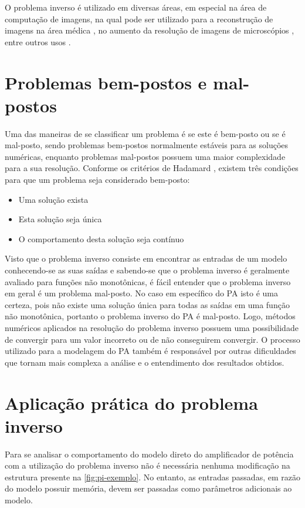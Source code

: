 O problema inverso é utilizado em diversas áreas, em especial na área de computação de imagens, na qual pode ser utilizado para a reconstrução de imagens na área médica \cite{mccann2016fast}, no aumento da resolução de imagens de microscópios \cite{kellman2019data}, entre outros usos \cite{9084378}.

\section{Problemas bem-postos e mal-postos} \label{sec:pi-posto}
Uma das maneiras de se classificar um problema é se este é bem-posto ou se é mal-posto, sendo problemas bem-postos normalmente estáveis para as soluções numéricas, enquanto problemas mal-postos possuem uma maior complexidade para a sua resolução. Conforme os critérios de Hadamard \cite{hadamard1902problemes}, existem três condições para que um problema seja considerado bem-posto:
\begin{itemize}
  \item Uma solução exista
  \item Esta solução seja única
  \item O comportamento desta solução seja contínuo
\end{itemize}

Visto que o problema inverso consiste em encontrar as entradas de um modelo conhecendo-se as suas saídas e sabendo-se que o problema inverso é geralmente avaliado para funções não monotônicas, é fácil entender que o problema inverso em geral é um problema mal-posto.
No caso em específico do PA isto é uma certeza, pois não existe uma solução única para todas as saídas em uma função não monotônica, portanto o problema inverso do PA é mal-posto. Logo, métodos numéricos aplicados na resolução do problema inverso possuem uma possibilidade de convergir para um valor incorreto ou de não conseguirem convergir. O processo utilizado para a modelagem do PA também é responsável por outras dificuldades que tornam mais complexa a análise e o entendimento dos resultados obtidos.

\section{Aplicação prática do problema inverso} \label{sec:pi-app}
Para se analisar o comportamento do modelo direto do amplificador de potência com a utilização do problema inverso não é necessária nenhuma modificação na estrutura presente na \autoref{fig:pi-exemplo}. No entanto, as entradas passadas, em razão do modelo possuir memória, devem ser passadas como parâmetros adicionais ao modelo.